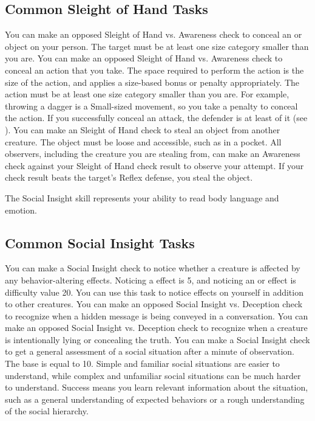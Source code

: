         \subsection{Common Sleight of Hand Tasks}
             You can make an opposed Sleight of Hand vs. Awareness check to conceal an  or  object on your person.
            The target must be at least one size category smaller than you are.
             You can make an opposed Sleight of Hand vs. Awareness check to conceal an action that you take.
            The space required to perform the action is the size of the action, and applies a size-based bonus or penalty appropriately.
            The action must be at least one size category smaller than you are.
            For example, throwing a dagger is a Small-sized movement, so you take a  penalty to conceal the action.
            If you successfully conceal an attack, the defender is at least \partiallyunaware of it (see ).
             You can make an Sleight of Hand check to steal an object from another creature.
            The object must be loose and accessible, such as in a pocket.
            All observers, including the creature you are stealing from, can make an Awareness check against your Sleight of Hand check result to observe your attempt.
            If your check result beats the target's Reflex defense, you steal the object.

\newpage
{}
        The Social Insight skill represents your ability to read body language and emotion.

    \subsection{Common Social Insight Tasks}
         You can make a Social Insight check to notice whether a creature is affected by any behavior-altering effects.
        Noticing a  effect is  5, and noticing an  or  effect is difficulty value 20.
        You can use this task to notice effects on yourself in addition to other creatures.
         You can make an opposed Social Insight vs. Deception check to recognize when a hidden message is being conveyed in a conversation.
         You can make an opposed Social Insight vs. Deception check to recognize when a creature is intentionally lying or concealing the truth.
        \label{Social Assessment}
        You can make a Social Insight check to get a general assessment of a social situation after a minute of observation.
        The base  is equal to 10.
        Simple and familiar social situations are easier to understand, while complex and unfamiliar social situations can be much harder to understand.
        Success means you learn relevant information about the situation, such as a general understanding of expected behaviors or a rough understanding of the social hierarchy.

